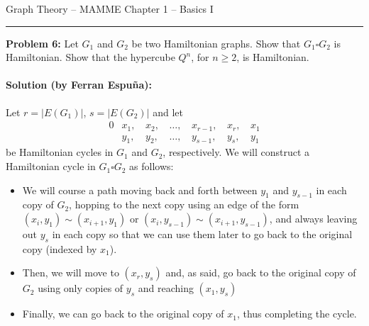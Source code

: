 \documentclass{amsart}
\theoremstyle{plain}
\theoremstyle{definition}
\begin{document}
    {\Large Graph Theory -- MAMME}
    {\Large Chapter 1 -- Basics I}

    \vspace{0.5cm}

    \hrule

    \vspace{0.5cm}

    \noindent \textbf{Problem 6:}
    Let $G_1$ and $G_2$ be two Hamiltonian graphs.
    Show that $G_1 \square G_2$ is Hamiltonian.
    Show that the hypercube $Q^n$, for $n \geq 2$, is Hamiltonian.


    \paragraph{\textbf{Solution (by Ferran Espuña):}}
    Let $r = \lvert E(G_1)\rvert$, $s = \lvert E(G_2)\rvert$ and let
    \begin{alignat*}{0}
    & x_1, \, & x_2, \, & \ldots, \, & x_{r-1}, \, & x_r, \, & x_1 \\
    & y_1, \, & y_2, \, & \ldots, \, & y_{s-1}, \, & y_s, \, & y_1
    \end{alignat*}
    be Hamiltonian cycles in $G_1$ and $G_2$, respectively.
    We will construct a Hamiltonian cycle in $G_1 \square G_2$ as follows:

    \begin{itemize}
        \item We will course a path moving back and forth between $y_1$ and $y_{s-1}$ in each copy of $G_2$,
    hopping to the next copy using an edge of the form $(x_i, y_1) \sim (x_{i+1}, y_{1})$ or
    $(x_i, y_{s-1}) \sim (x_{i+1}, y_{s-1})$,
    and always leaving out $y_s$ in each copy so that we can use them later to go back to the original copy (indexed by $x_1$).
        \item Then, we will move to $(x_r, y_s)$ and, as said, go back to the original copy of $G_2$ using only copies of $y_s$ and reaching $(x_1, y_s)$
        \item Finally, we can go back to the original copy of $x_1$, thus completing the cycle.
    \end{itemize}
\end{document}
